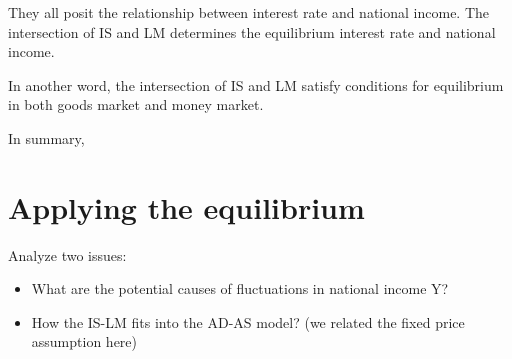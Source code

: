 \documentclass[10pt]{article}
\begin{document}
They all posit the relationship between interest rate and national income. The 
intersection of IS and LM determines the equilibrium interest rate and national income. 

In another word, the intersection of IS and LM satisfy conditions for equilibrium in
both goods market and money market.

\begin{figure}[H]
\end{figure}



In summary,

\begin{figure}[H]
\end{figure}





\section{Applying the equilibrium}
Analyze two issues:
\begin{itemize}
\item What are the potential causes of fluctuations in national income Y?
\item How the IS-LM fits into the AD-AS model? (we related the fixed price assumption here)
\end{itemize}
\end{document}
